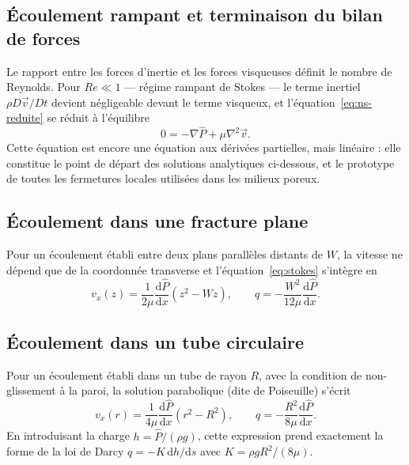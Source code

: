\documentclass[11pt,a4paper]{report}
\newcommand{\Chat}{\hat{P}}
\newcommand{\vx}{v_x}
\begin{document}
\subsection{Écoulement rampant et terminaison du bilan de forces}

Le rapport entre les forces d'inertie et les forces visqueuses définit le nombre de Reynolds. Pour
\(Re \ll 1\) — régime rampant de Stokes — le terme inertiel \(\rho D\vec{v}/Dt\) devient négligeable devant
le terme visqueux, et l'équation~\eqref{eq:ns-reduite} se réduit à l'équilibre
\begin{equation}
0 = -\nabla\Chat + \mu\nabla^2\vec{v}.
\label{eq:stokes}
\end{equation}
Cette équation est encore une équation aux dérivées partielles, mais linéaire : elle constitue le point de
départ des solutions analytiques ci-dessous, et le prototype de toutes les fermetures locales utilisées
dans les milieux poreux.

\subsection{Écoulement dans une fracture plane}

Pour un écoulement établi entre deux plans parallèles distants de \(W\), la vitesse ne dépend que de la
coordonnée transverse et l'équation~\eqref{eq:stokes} s'intègre en
\begin{equation}
\vx(z) = \frac{1}{2\mu}\frac{\mathrm{d}\Chat}{\mathrm{d}x}\left(z^2 - Wz\right),
\qquad
q = -\frac{W^2}{12\mu}\frac{\mathrm{d}\Chat}{\mathrm{d}x}.
\label{eq:fracture}
\end{equation}

\subsection{Écoulement dans un tube circulaire}

Pour un écoulement établi dans un tube de rayon \(R\), avec la condition de non-glissement à la paroi, la
solution parabolique (dite de Poiseuille) s'écrit
\begin{equation}
\vx(r) = \frac{1}{4\mu}\frac{\mathrm{d}\Chat}{\mathrm{d}x}\left(r^2-R^2\right),
\qquad
q = -\frac{R^2}{8\mu}\frac{\mathrm{d}\Chat}{\mathrm{d}x} .
\label{eq:poiseuille-ann}
\end{equation}
En introduisant la charge \(h = \Chat/(\rho g)\), cette expression prend exactement la forme de la loi de
Darcy \(q = -K\,\mathrm{d}h/\mathrm{d}s\) avec \(K = \rho g R^2/(8\mu)\).
\end{document}
